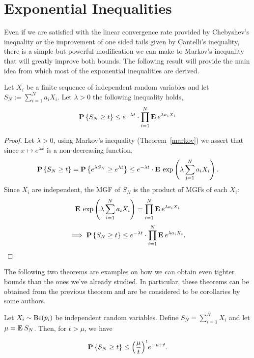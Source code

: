 \chapter{Exponential Inequalities}

Even if we are satisfied with the linear convergence rate provided by Chebyshev's inequality or the improvement of one sided tails given by Cantelli's inequality, there is a simple but powerful modification we can make to Markov's inequality that will greatly improve both bounds. The following result will provide the main idea from which most of the exponential inequalities are derived.

\begin{theorem}\label{mgf}
  Let $X_i$ be a finite sequence of independent random variables and let $S_N := \sum_{i = 1}^N a_i X_i$. Let $\lambda > 0$ the following inequality holds,
  \[ \P\left\{  S_N \geq t\right\} \leq e^{-\lambda t}\cdot \prod_{i = 1}^N \E e^{\lambda a_i X_i} \] 

\end{theorem}

\begin{proof}
  Let $\lambda > 0$, using Markov's inequality (Theorem~\ref{markov}) we assert that since $x\mapsto e^{\lambda x}$ is a non-decreasing function,
  \[ \P\left\{  S_N \geq t\right\} = \P\left\{  e^{\lambda S_N} \geq e^{\lambda t}\right\} \leq e^{-\lambda t} \cdot \E \exp\left( \lambda \sum_{i = 1}^N a_i X_i \right). \]
  Since $X_i$ are independent, the MGF of $S_N$ is the product of MGFs of each $X_i$:
  \[\E \exp\left( \lambda \sum_{i = 1}^N a_i X_i \right) = \prod_{i = 1}^N \E e^{\lambda a_i X_i} \] 
  \[ \implies \P\left\{  S_N \geq t\right\} \leq e^{-\lambda t}\cdot \prod_{i = 1}^N \E e^{\lambda a_i X_i}. \]
\end{proof}

The following two theorems are examples on how we can obtain even tighter bounds than the ones we've already studied. In particular, these theorems can be obtained from the previous theorem and are be considered to be corollaries by some authors.

\begin{theorem}\label{chernoff:bernoulli}
  Let $X_i \sim \Be(p_i)$ be independent random variables. Define $S_N = \sum_{i = 1}^{N} X_i$ and let $\mu = \E S_N$. Then, for $t > \mu$, we have
  
  \[ \P\left\{  S_N \geq t\right\} \leq  {\left(\frac{\mu}{t}\right)}^t e^{-\mu+t} .\] 
\end{theorem}

